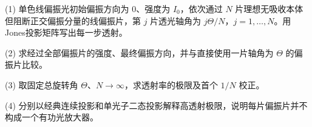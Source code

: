 (1) 单色线偏振光初始偏振方向为 \(0\)、强度为 \(I_0\)，依次通过 \(N\) 片理想无吸收本体但阻断正交偏振分量的线偏振片，第 \(j\) 片透光轴角为 \(j\Theta/N\)，\(j=1,\ldots,N\)。用Jones投影矩阵写出每一步透射。

(2) 求经过全部偏振片的强度、最终偏振方向，并与直接使用一片轴角为 \(\Theta\) 的偏振片比较。

(3) 取固定总旋转角 \(\Theta\)、\(N\to\infty\)，求透射率的极限及首个 \(1/N\) 校正。

(4) 分别以经典连续投影和单光子二态投影解释高透射极限，说明每片偏振片并不构成一个有功光放大器。

